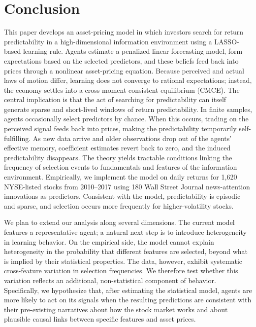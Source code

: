 \section{Conclusion}\label{sec:conclusion}

This paper develops an asset-pricing model in which investors search for return predictability in a high-dimensional information environment using a LASSO-based learning rule.
Agents estimate a penalized linear forecasting model, form expectations based on the selected predictors, and these beliefs feed back into prices through a nonlinear asset-pricing equation.
Because perceived and actual laws of motion differ, learning does not converge to rational expectations; instead, the economy settles into a cross-moment consistent equilibrium (CMCE).
The central implication is that the act of searching for predictability can itself generate sparse and short-lived windows of return predictability.
In finite samples, agents occasionally select predictors by chance.
When this occurs, trading on the perceived signal feeds back into prices, making the predictability temporarily self-fulfilling.
As new data arrive and older observations drop out of the agents’ effective memory, coefficient estimates revert back to zero, and the induced predictability disappears.
The theory yields tractable conditions linking the frequency of selection events to fundamentals and features of the information environment.
Empirically, we implement the model on daily returns for 1{,}620 NYSE-listed stocks from 2010--2017 using 180 Wall Street Journal news-attention innovations as predictors.
Consistent with the model, predictability is episodic and sparse, and selection occurs more frequently for higher-volatility stocks.


We plan to extend our analysis along several dimensions.
The current model features a representative agent; a natural next step is to introduce heterogeneity in learning behavior.
On the empirical side, the model cannot explain heterogeneity in the probability that different features are selected, beyond what is implied by their statistical properties. 
The data, however, exhibit systematic cross-feature variation in selection frequencies. 
We therefore test whether this variation reflects an additional, non-statistical component of behavior. 
Specifically, we hypothesize that, after estimating the statistical model, agents are more likely to act on its signals when the resulting predictions are consistent with their pre-existing narratives about how the stock market works and about plausible causal links between specific features and asset prices.




